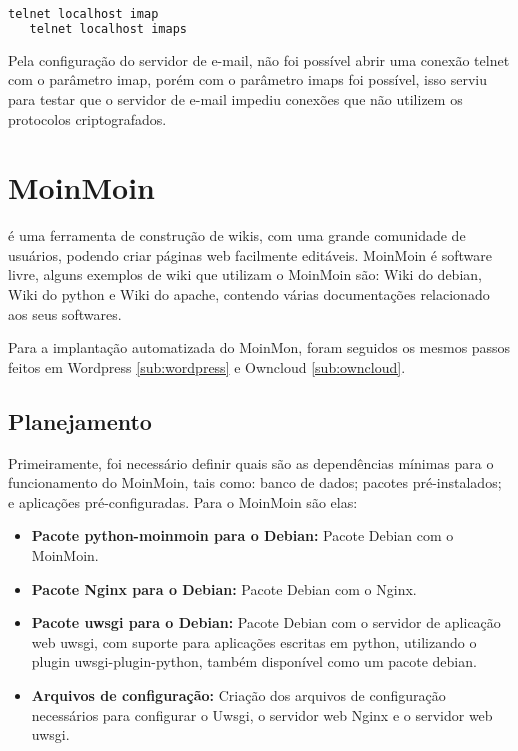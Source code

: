 \begin{lstlisting}[language=Ruby,label=dice_index,caption={Exemplo de teste de conexão telnet no servidor imap}]
   telnet localhost imap
   telnet localhost imaps
\end{lstlisting}

Pela configuração do servidor de e-mail, não foi possível abrir uma conexão telnet
com o parâmetro imap, porém com o parâmetro imaps foi possível, isso serviu para testar 
que o servidor de e-mail impediu conexões que não 
utilizem os protocolos criptografados.

\section{MoinMoin}
\label{sub:moinmoin}

\cite{moin} é uma ferramenta de construção
de wikis, com uma grande comunidade de usuários, podendo criar páginas web
facilmente editáveis. MoinMoin é software livre, alguns exemplos
de wiki que utilizam o MoinMoin são: Wiki do debian, Wiki do python e Wiki do apache,
contendo várias documentações relacionado aos seus softwares. 

Para a implantação automatizada do MoinMon, foram seguidos os mesmos passos
feitos em Wordpress \ref{sub:wordpress} e Owncloud \ref{sub:owncloud}.

\subsection{Planejamento}

Primeiramente, foi necessário definir quais são as dependências
mínimas para o funcionamento do MoinMoin, tais como: banco de dados; pacotes
pré-instalados; e aplicações pré-configuradas. Para o MoinMoin são elas:

\begin{itemize}
   \item \textbf{Pacote python-moinmoin para o Debian:} Pacote Debian com o MoinMoin.
   \item \textbf{Pacote Nginx para o Debian:} Pacote Debian com o Nginx.
   \item \textbf{Pacote uwsgi para o Debian:} Pacote Debian com o servidor de aplicação web
uwsgi, com suporte para aplicações escritas em python, utilizando o plugin uwsgi-plugin-python,
também disponível como um pacote debian.
   \item \textbf{Arquivos de configuração:} Criação dos arquivos de configuração
   necessários para configurar o Uwsgi, o servidor web Nginx e o servidor web
uwsgi.
\end{itemize}

